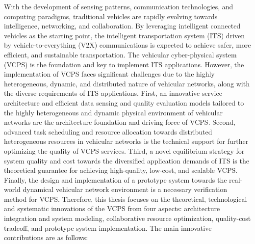 \begin{eabstract}	%

With the development of sensing patterns, communication technologies, and computing paradigms, traditional vehicles are rapidly evolving towards intelligence, networking, and collaboration. By leveraging intelligent connected vehicles as the starting point, the intelligent transportation system (ITS) driven by vehicle-to-everything (V2X) communications is expected to achieve safer, more efficient, and sustainable transportation. The vehicular cyber-physical system (VCPS) is the foundation and key to implement ITS applications. However, the implementation of VCPS faces significant challenges due to the highly heterogeneous, dynamic, and distributed nature of vehicular networks, along with the diverse requirements of ITS applications. First, an innovative service architecture and efficient data sensing and quality evaluation models tailored to the highly heterogeneous and dynamic physical environment of vehicular networks are the architecture foundation and driving force of VCPS. Second, advanced task scheduling and resource allocation towards distributed heterogeneous resources in vehicular networks is the technical support for further optimizing the quality of VCPS services. Third, a novel equilibrium strategy for system quality and cost towards the diversified application demands of ITS is the theoretical guarantee for achieving high-quality, low-cost, and scalable VCPS. Finally, the design and implementation of a prototype system towards the real-world dynamical vehicular network environment is a necessary verification method for VCPS. Therefore, this thesis focuses on the theoretical, technological and systematic innovations of the VCPS from four aspects: architecture integration and system modeling, collaborative resource optimization, quality-cost tradeoff, and prototype system implementation. The main innovative contributions are as follows:


\end{eabstract}
